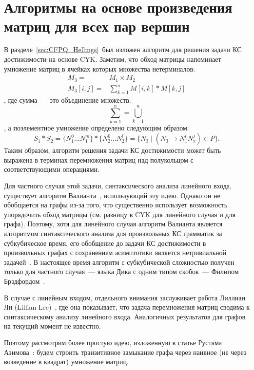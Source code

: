 \section[Алгоритмы на основе произведения матриц для всех пар вершин]{Алгоритмы на основе произведения матриц для всех пар вершин}
\label{sec:CFPQ_MatrixBased}

В разделе~\ref{sec:CFPQ_Hellings}~был изложен алгоритм для решения задачи КС достижимости на основе CYK.
Заметим, что обход матрицы напоминает умножение матриц в ячейках которых множества нетерминалов:
\begin{align*}
M_3 = &M_1 \times M_2 \\
M_3[i,j] = &\sum_{k=1}^{n} M[i,k] * M[k,j]
\end{align*}
, где сумма~--- это объединение множеств:
\[
\sum_{k=1}^{n} = \bigcup_{k=1}^{n}
\]
, а поэлементное умножение определено следующим образом:
\[
S_1 * S_2 = \{N_1^0 ... N_1^m\} * \{N_2^0 ... N_2^l\} = \{N_3 \mid (N_3 \rightarrow N_1^i N_2^j) \in P\}.
\]
Таким образом, алгоритм решения задачи КС достижимости может быть выражена в терминах перемножения матриц над полукольцом с соответствующими операциями.

Для частного случая этой задачи, синтаксического анализа линейного входа, существует алгоритм Валианта~, использующий эту идею.
Однако он не обобщается на графы из-за того, что существенно использует возможность упорядочить обход матрицы (см. разницу в CYK для линейного случая и для графа).
Поэтому, хотя для линейного случая алгоритм Валианта является алгоритмом синтаксического анализа для произвольных КС грамматик за субкубическое время, его обобщение до задачи КС достижимости в произвольных графах с сохранением асимптотики является нетривиальной задачей~.
В настоящее время алгоритм с субкубической сложностью получен только для частного случая~--- языка Дика с одним типом скобок~--- Филипом Брэдфордом~.

В случае с линейным входом, отдельного внимания заслуживает работа Лиллиан Ли (Lillian Lee)~, где она показывает, что задача перемножения матриц сводима к синтаксическому анализу линейного входа. Аналогичных результатов для графов на текущий момент не известно.

Поэтому рассмотрим более простую идею, изложенную в статье Рустама Азимова~: будем строить транзитивное замыкание графа через наивное (не через возведение в квадрат) умножение матриц.

